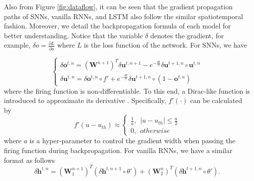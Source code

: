 \documentclass[journal,10pt,twocolumn]{IEEETran}
\begin{document}
Also from Figure \ref{fig:dataflow}, it can be seen that the gradient propagation paths of SNNs, vanilla RNNs, and LSTM also follow the similar spatiotemporal fashion. Moreover, we detail the backpropagation formula of each model for better understanding. Notice that the variable $\delta$ denotes the gradient, for example, $\delta o=\frac{\partial L}{\partial o}$ where $L$ is the loss function of the network. For SNNs, we have
\begin{comment}
\begin{equation}
\label{equ:SNN_bp}
\begin{cases}
\delta \pmb{o}^{t,n}
=
(\pmb{W}^{n+1})^T(\delta \pmb{o}^{t,n+1} \circ f') - e^{-\frac{dt}{\tau}}\delta \pmb{o}^{t+1,n}\circ f'\circ \pmb{u}^{t,n}
\\
\delta \pmb{u}^{t,n}
=
\delta \pmb{o}^{t,n} \circ f' + e^{-\frac{dt}{\tau}}\delta \pmb{o}^{t+1,n}\circ f' \circ (1-\pmb{o}^{t,n})
\end{cases}
\end{equation}
\end{comment}
\begin{equation}
\label{equ:SNN_bp}
\begin{cases}
\delta \pmb{o}^{t,n} = (\pmb{W}^{n+1})^T\delta \pmb{u}^{t,n+1} - e^{-\frac{dt}{\tau}} \delta \pmb{u}^{t+1,n}\circ \pmb{u}^{t,n}
\\
\delta \pmb{u}^{t,n} = \delta \pmb{o}^{t,n}\circ f' + e^{-\frac{dt}{\tau}} \delta \pmb{u}^{t+1,n}\circ (1-\pmb{o}^{t,n})
\end{cases}
\end{equation}
where the firing function is non-differentiable. To this end, a Dirac-like function is introduced to approximate its derivative \cite{wu2018spatio}. Specifically, $f'(\cdot)$ can be calculated by
\begin{equation}
    \label{equ:fire_bp}
    f'(u-u_{th}) \approx
    \begin{cases}
    \frac{1}{a},~~|u-u_{th}|\leq \frac{a}{2} \\
    0,~~otherwise
    \end{cases}
\end{equation}
where $a$ is a hyper-parameter to control the gradient width when passing the firing function during backpropagation. For vanilla RNNs, we have a similar format as follows
\begin{equation}
\label{equ:vanilla_RNN_bp}
\delta \pmb{h}^{t,n}=(\pmb{W}_1^{n+1})^T(\delta \pmb{h}^{t,n+1}\circ \theta') + (\pmb{W}_2^{n})^T(\delta \pmb{h}^{t+1,n}\circ \theta').
\end{equation}
\end{document}
